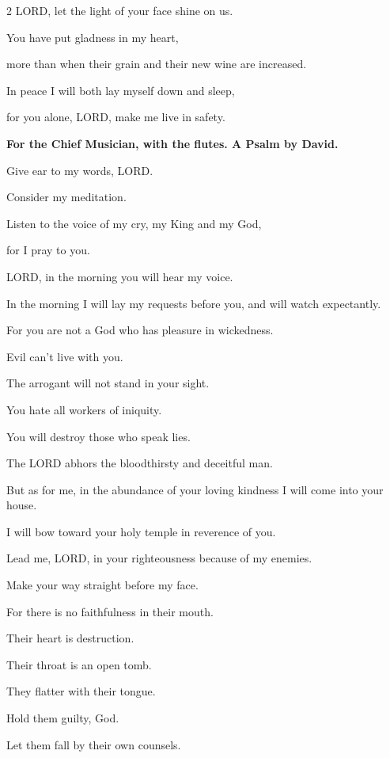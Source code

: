 \begin{multicols}{2}
	LORD, let the light of your face shine on us.
	
	
	\myverse{}You have put gladness in my heart,
	
	more than when their grain and their new wine are increased.
	
	
	\myverse{}In peace I will both lay myself down and sleep,
	
	for you alone, LORD, make me live in safety.
	
	\mychapter{}\textbf{For the Chief Musician, with the flutes. A Psalm by David.}
	
	\myverse*{}Give ear to my words, LORD.
	
	Consider my meditation.
	
	
	\myverse{}Listen to the voice of my cry, my King and my God,
	
	for I pray to you.
	
	
	\myverse{}LORD, in the morning you will hear my voice.
	
	In the morning I will lay my requests before you, and will watch expectantly.
	
	
	\myverse{}For you are not a God who has pleasure in wickedness.
	
	Evil can’t live with you.
	
	
	\myverse{}The arrogant will not stand in your sight.
	
	You hate all workers of iniquity.
	
	
	\myverse{}You will destroy those who speak lies.
	
	The LORD abhors the bloodthirsty and deceitful man.
	
	
	\myverse{}But as for me, in the abundance of your loving kindness I will
	come into your house.
	
	I will bow toward your holy temple in reverence of you.
	
	
	\myverse{}Lead me, LORD, in your righteousness because of my enemies.
	
	Make your way straight before my face.
	
	
	\myverse{}For there is no faithfulness in their mouth.
	
	Their heart is destruction.
	
	Their throat is an open tomb.
	
	They flatter with their tongue.
	
	
	\myverse{}Hold them guilty, God.
	
	Let them fall by their own counsels.
	

\end{multicols}

